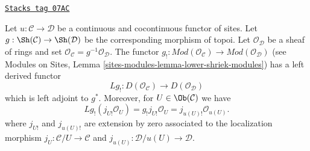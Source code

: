 \begin{lemma}
\label{sites-cohomology-lemma-existence-derived-lower-shriek}
\href{https://stacks.math.columbia.edu/tag/07AC}{\texttt{Stacks tag 07AC}}

Let $u : \mathcal{C} \to \mathcal{D}$ be a continuous and cocontinuous
functor of sites. Let $g : \Sh(\mathcal{C}) \to \Sh(\mathcal{D})$ be the
corresponding morphism of topoi. Let $\mathcal{O}_\mathcal{D}$
be a sheaf of rings and set
$\mathcal{O}_\mathcal{C} = g^{-1}\mathcal{O}_\mathcal{D}$.
The functor $g_! : \textit{Mod}(\mathcal{O}_\mathcal{C}) \to
\textit{Mod}(\mathcal{O}_\mathcal{D})$
(see
Modules on Sites, Lemma \ref{sites-modules-lemma-lower-shriek-modules})
has a left derived functor
$$
Lg_! : D(\mathcal{O}_\mathcal{C}) \longrightarrow D(\mathcal{O}_\mathcal{D})
$$
which is left adjoint to $g^*$. Moreover, for $U \in \Ob(\mathcal{C})$ we
have
$$
Lg_!(j_{U!}\mathcal{O}_U) =
g_!j_{U!}\mathcal{O}_U =
j_{u(U)!} \mathcal{O}_{u(U)}.
$$
where $j_{U!}$ and $j_{u(U)!}$ are extension by zero associated to the
localization morphism
$j_U : \mathcal{C}/U \to \mathcal{C}$ and
$j_{u(U)} : \mathcal{D}/u(U) \to \mathcal{D}$.
\end{lemma}


